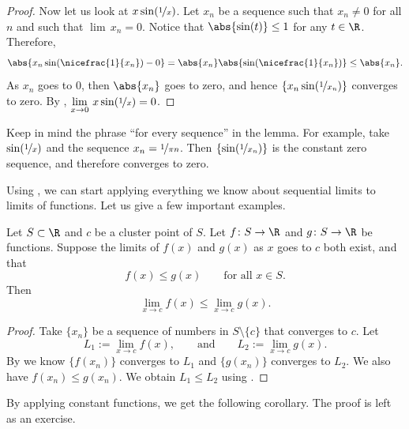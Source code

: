 \documentclass[12pt]{book}
\begin{document}
\begin{example}
\begin{proof}
Now let us look at $x\sin(\nicefrac{1}{x})$.
Let $x_n$ be a sequence
such that $x_n \not= 0$ for all $n$ and such that $\lim\, x_n = 0$.
Notice
that $\abs{\sin(t)} \leq 1$ for any $t \in \R$.
Therefore,
\begin{equation*}
\abs{x_n\sin(\nicefrac{1}{x_n})-0}
=
\abs{x_n}\abs{\sin(\nicefrac{1}{x_n})}
\leq
\abs{x_n} .
\end{equation*}
As $x_n$ goes to 0, then $\abs{x_n}$ goes to zero, and hence
$\{ x_n\sin(\nicefrac{1}{x_n}) \}$ converges to zero.
By
, 
$\displaystyle \lim_{x \to 0} \, x\sin( \nicefrac{1}{x} ) = 0$.
\end{proof}
\end{example}

Keep in mind the phrase ``for every sequence'' in the lemma.
For example, take $\sin(\nicefrac{1}{x})$ and the sequence $x_n = \nicefrac{1}{\pi n}$.
Then $\{ \sin (\nicefrac{1}{x_n}) \}$ is the constant zero sequence, and
therefore converges to zero.

Using , 
we can start applying everything we know about
sequential limits to limits of functions.
Let us give a few important
examples.

\begin{cor}
Let $S \subset \R$ and $c$ be a cluster point of $S$.
Let $f \colon S \to
\R$ and $g \colon S \to \R$ be functions.
Suppose the limits of $f(x)$ and $g(x)$ as $x$ goes to $c$ both exist,
and that
\begin{equation*}
f(x) \leq g(x) \qquad \text{for all $x \in S$}.
\end{equation*}
Then
\begin{equation*}
\lim_{x\to c} f(x) \leq \lim_{x\to c} g(x) .
\end{equation*}
\end{cor}

\begin{proof}
Take $\{ x_n \}$ be a sequence of numbers in $S \setminus \{ c \}$
that converges to $c$.
Let
\begin{equation*}
L_1 := \lim_{x\to c} f(x), \qquad \text{and} \qquad L_2 := \lim_{x\to c} g(x) .
\end{equation*}
By  we know $\{ f(x_n) \}$ converges to
$L_1$ and $\{ g(x_n) \}$ converges to $L_2$.
We also
have $f(x_n) \leq g(x_n)$.
We obtain $L_1 \leq L_2$ using
.
\end{proof}

By applying constant functions, we get the following corollary.
The
proof is left as an exercise.
\end{document}
